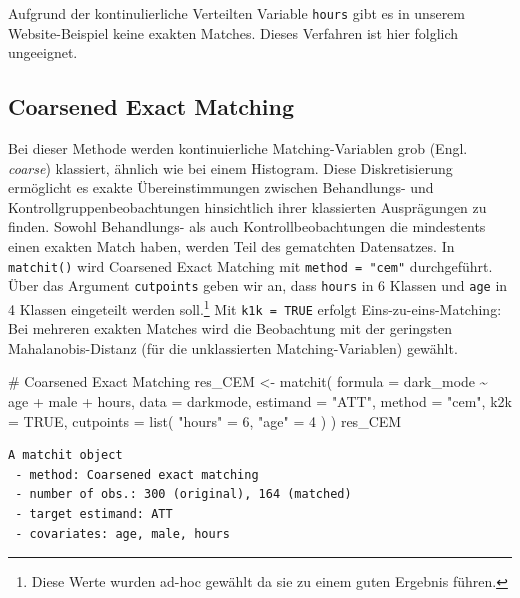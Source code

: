 \documentclass[
  a4paper,
  DIV=11,
  oneside]{scrreprt}
\newenvironment{Shaded}{\begin{snugshade}}{\end{snugshade}}
\newcommand{\AttributeTok}[1]{\textcolor[rgb]{0.40,0.45,0.13}{#1}}
\newcommand{\CommentTok}[1]{\textcolor[rgb]{0.37,0.37,0.37}{#1}}
\newcommand{\ConstantTok}[1]{\textcolor[rgb]{0.56,0.35,0.01}{#1}}
\newcommand{\DecValTok}[1]{\textcolor[rgb]{0.68,0.00,0.00}{#1}}
\newcommand{\FunctionTok}[1]{\textcolor[rgb]{0.28,0.35,0.67}{#1}}
\newcommand{\NormalTok}[1]{\textcolor[rgb]{0.00,0.23,0.31}{#1}}
\newcommand{\OtherTok}[1]{\textcolor[rgb]{0.00,0.23,0.31}{#1}}
\newcommand{\SpecialCharTok}[1]{\textcolor[rgb]{0.37,0.37,0.37}{#1}}
\newcommand{\StringTok}[1]{\textcolor[rgb]{0.13,0.47,0.30}{#1}}
\begin{document}
Aufgrund der kontinulierliche Verteilten Variable \texttt{hours} gibt es
in unserem Website-Beispiel keine exakten Matches. Dieses Verfahren ist
hier folglich ungeeignet.

\subsection{Coarsened Exact Matching}\label{coarsened-exact-matching}

Bei dieser Methode werden kontinuierliche Matching-Variablen grob (Engl.
\emph{coarse}) klassiert, ähnlich wie bei einem Histogram. Diese
Diskretisierung ermöglicht es exakte Übereinstimmungen zwischen
Behandlungs- und Kontrollgruppenbeobachtungen hinsichtlich ihrer
klassierten Ausprägungen zu finden. Sowohl Behandlungs- als auch
Kontrollbeobachtungen die mindestents einen exakten Match haben, werden
Teil des gematchten Datensatzes. In \texttt{matchit()} wird Coarsened
Exact Matching mit \texttt{method\ =\ "cem"} durchgeführt. Über das
Argument \texttt{cutpoints} geben wir an, dass \texttt{hours} in 6
Klassen und \texttt{age} in 4 Klassen eingeteilt werden soll.\footnote{Diese
  Werte wurden ad-hoc gewählt da sie zu einem guten Ergebnis führen.}
Mit \texttt{k1k\ =\ TRUE} erfolgt Eins-zu-eins-Matching: Bei mehreren
exakten Matches wird die Beobachtung mit der geringsten
Mahalanobis-Distanz (für die unklassierten Matching-Variablen) gewählt.

\begin{Shaded}
\begin{Highlighting}[]
\CommentTok{\# Coarsened Exact Matching}
\NormalTok{res\_CEM }\OtherTok{\textless{}{-}} \FunctionTok{matchit}\NormalTok{(}
  \AttributeTok{formula =}\NormalTok{ dark\_mode }\SpecialCharTok{\textasciitilde{}}\NormalTok{ age }\SpecialCharTok{+}\NormalTok{ male }\SpecialCharTok{+}\NormalTok{ hours, }
  \AttributeTok{data =}\NormalTok{ darkmode, }
  \AttributeTok{estimand =} \StringTok{"ATT"}\NormalTok{,}
  \AttributeTok{method =} \StringTok{"cem"}\NormalTok{, }
  \AttributeTok{k2k =} \ConstantTok{TRUE}\NormalTok{,}
  \AttributeTok{cutpoints =} \FunctionTok{list}\NormalTok{(}
    \StringTok{"hours"} \OtherTok{=} \DecValTok{6}\NormalTok{, }
    \StringTok{"age"} \OtherTok{=} \DecValTok{4}
\NormalTok{  ) }
\NormalTok{)}
\NormalTok{res\_CEM}
\end{Highlighting}
\end{Shaded}

\begin{verbatim}
A matchit object
 - method: Coarsened exact matching
 - number of obs.: 300 (original), 164 (matched)
 - target estimand: ATT
 - covariates: age, male, hours
\end{verbatim}
\end{document}
